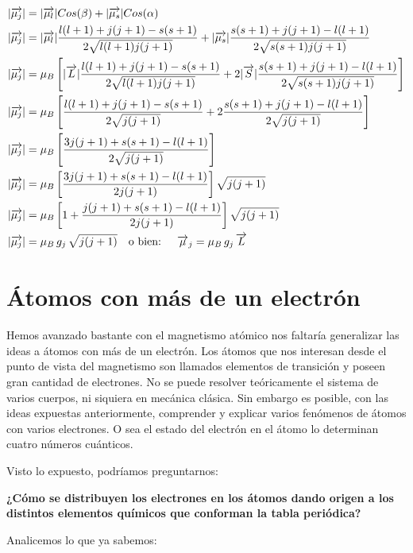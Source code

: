 \begin{equation*}
	\begin{aligned}[c]
	&\vert \overrightarrow{\mu_{j}} \vert=\vert \overrightarrow{\mu_{l}} \vert Cos(\beta)+\vert \overrightarrow{\mu_{s}} \vert Cos(\alpha) \\
	&\vert \overrightarrow{\mu_{j}} \vert=\vert \overrightarrow{\mu_{l}} \vert\dfrac{l(l + 1)+j(j + 1)-s(s + 1)}{2\sqrt{l(l + 1)j(j + 1)}}+\vert \overrightarrow{\mu_{s}} \vert\dfrac{s(s + 1)+j(j + 1)-l(l + 1)}{2\sqrt{s(s + 1)j(j + 1)}} \\
	&\vert \overrightarrow{\mu_{j}} \vert=\mu_{B}\left[\vert \overrightarrow{L} \vert \dfrac{l(l + 1)+j(j + 1)-s(s + 1)}{2\sqrt{l(l + 1)j(j + 1)}}+2\vert \overrightarrow{S} \vert\dfrac{s(s + 1)+j(j + 1)-l(l + 1)}{2\sqrt{s(s + 1)j(j + 1)}}\right] \\ 
	&\vert \overrightarrow{\mu_{j}} \vert=\mu_{B}\left[ \dfrac{l(l + 1)+j(j + 1)-s(s + 1)}{2\sqrt{j(j + 1)}}+2\dfrac{s(s + 1)+j(j + 1)-l(l + 1)}{2\sqrt{j(j + 1)}}\right] \\
	&\vert \overrightarrow{\mu_{j}} \vert=\mu_{B}\left[ \dfrac{3j(j + 1)+s(s + 1)-l(l + 1)}{2\sqrt{j(j + 1)}} \right] \\
	&\vert \overrightarrow{\mu_{j}} \vert=\mu_{B}\left[ \dfrac{3j(j + 1)+s(s + 1)-l(l + 1)}{2j(j + 1)} \right]\sqrt{ j(j + 1)} \\	
	&\vert \overrightarrow{\mu_{j}} \vert=\mu_{B}\left[1+ \dfrac{j(j + 1)+s(s + 1)-l(l + 1)}{2j(j + 1)} \right]\sqrt{j(j + 1)} \\	
	&\vert \overrightarrow{\mu_{j}} \vert=\mu_{B}\,g_{j}\,\sqrt{j(j + 1)}\quad \text{o bien: } \quad \overrightarrow{\mu}_{j}=\mu_{B}\,g_{j}\,\overrightarrow{L} 	
	\end{aligned}
\end{equation*} 



\section{Átomos con más de un electrón}
Hemos avanzado bastante con el magnetismo atómico nos faltaría generalizar las ideas a átomos con más de un electrón. Los átomos que nos interesan desde el punto de vista del magnetismo son llamados elementos de transición y poseen gran cantidad de electrones. No se puede resolver teóricamente el sistema de varios cuerpos, ni siquiera en mecánica clásica. Sin embargo es posible, con las ideas expuestas anteriormente, comprender y explicar varios fenómenos de átomos con varios electrones. O sea el estado del electrón en el átomo lo determinan cuatro números cuánticos.


Visto lo expuesto, podríamos preguntarnos:

\textbf{¿Cómo se distribuyen los electrones en los átomos dando origen a los distintos elementos químicos que conforman la tabla periódica?}

Analicemos lo que ya sabemos:

